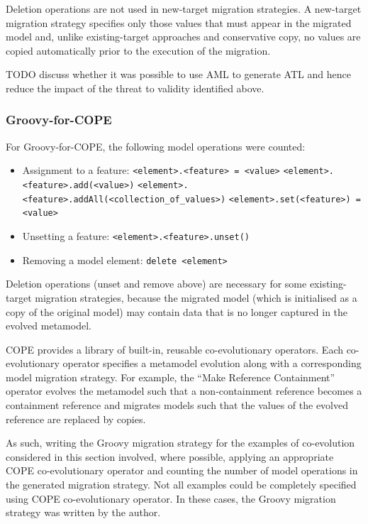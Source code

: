 Deletion operations are not used in new-target migration strategies. A new-target migration strategy specifies only those values that must appear in the migrated model and, unlike existing-target approaches and conservative copy, no values are copied automatically prior to the execution of the migration.

TODO discuss whether it was possible to use AML to generate ATL and hence reduce the impact of the threat to validity identified above.

\subsubsection{Groovy-for-COPE}
For Groovy-for-COPE, the following model operations were counted:

\begin{itemize}
	\item Assignment to a feature:
	\subitem \texttt{<element>.<feature> = <value>}
	\subitem \texttt{<element>.<feature>.add(<value>)}
	\subitem \texttt{<element>.<feature>.addAll(<collection\_of\_values>)}
	\subitem \texttt{<element>.set(<feature>) = <value>}
	
	\item Unsetting a feature:
	\subitem \texttt{<element>.<feature>.unset()}	
	
	\item Removing a model element:
	\subitem \texttt{delete <element>}
\end{itemize}

Deletion operations (unset and remove above) are necessary for some existing-target migration strategies, because the migrated model (which is initialised as a copy of the original model) may contain data that is no longer captured in the evolved metamodel.

COPE provides a library of built-in, reusable co-evolutionary operators. Each co-evolutionary operator specifies a metamodel evolution along with a corresponding model migration strategy. For example, the ``Make Reference Containment'' operator evolves the metamodel such that a non-containment reference becomes a containment reference and migrates models such that the values of the evolved reference are replaced by copies.

As such, writing the Groovy migration strategy for the examples of co-evolution considered in this section involved, where possible, applying an appropriate COPE co-evolutionary operator and counting the number of model operations in the generated migration strategy. Not all examples could be completely specified using COPE co-evolutionary operator. In these cases, the Groovy migration strategy was written by the author.



